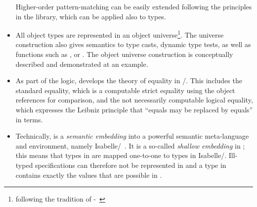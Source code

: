 \begin{itemize}
         Higher-order pattern-matching can be easily extended following 
         the principles in the \HOL library, which can be applied also to \FOCL types.
 \item All object types are represented in an object universe\footnote{following
         the tradition of \HOL-\OCL~\cite{brucker.ea:extensible:2008-b}}.
         The universe construction also gives semantics to type casts, dynamic type
         tests, as well as functions such as ,
         or . The object universe construction is
         conceptually described and demonstrated at an example.
 \item As part of the \OCL logic,  \FOCL develops the theory of
         equality in \UML/\OCL. This includes the standard equality, which is a
         computable strict equality using the object references for comparison,
         and the not necessarily computable logical equality, which expresses
         the Leibniz principle that ``equals may be replaced by equals'' in
         \OCL terms. 
 \item Technically,  \FOCL is a \emph{semantic embedding} into a
         powerful semantic meta-language and
         environment, namely Isabelle/\HOL~\cite{nipkow.ea:isabelle:2002}.
         It is a so-called \emph{shallow embedding} in \HOL; this means that types
         in \OCL are mapped one-to-one to types in Isabelle/\HOL.
         Ill-typed \OCL specifications can therefore not be represented in
          \FOCL and a type in  \FOCL contains exactly
         the values that are possible in \OCL\@.
\end{itemize}

